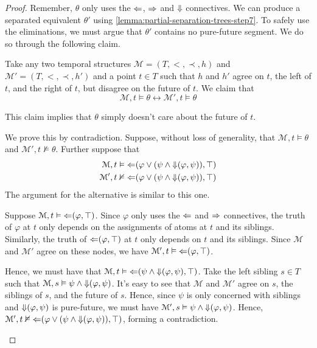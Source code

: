 \documentclass[a4paper,UKenglish,cleveref, autoref, thm-restate, numberwithinsect]{lipics-v2021}
\def\Larrow{\ensuremath\mathord{\Leftarrow}}
\def\Rarrow{\ensuremath\mathord{\Rightarrow}}
\def\Darrow{\ensuremath\mathord{\Downarrow}}
\begin{document}
\begin{proof}
    Remember, $\theta$ only uses the $\Larrow$, $\Rarrow$ and $\Darrow$ connectives. We can produce a separated equivalent $\theta'$ using \cref{lemma:partial-separation-trees-step7}. To safely use the eliminations, we must argue that $\theta'$ contains no pure-future segment. We do so through the following claim.
    \begin{claim*}
        Take any two temporal structures $\mathcal{M} = (T, <, \prec, h)$ and $\mathcal{M}' = (T, <, \prec, h')$ and a point $t \in T$ such that $h$ and $h'$ agree on $t$, the left of $t$, and the right of $t$, but disagree on the future of $t$. We claim that
        \begin{equation*}
            \mathcal{M}, t \vDash \theta \longleftrightarrow \mathcal{M}', t \vDash \theta
        \end{equation*}
        \begin{note*}
            This claim implies that $\theta$ simply doesn't care about the future of $t$.
        \end{note*}
    \end{claim*}
    \begin{claimproof}
        We prove this by contradiction. Suppose, without loss of generality, that $\mathcal{M}, t \vDash \theta$ and $\mathcal{M}', t \nvDash \theta$. Further suppose that
        \begin{equation*}
            \begin{aligned}
                \mathcal{M}, t &\vDash \Larrow(\varphi \lor (\psi \land \Darrow(\varphi, \psi)), \top)\\
                \mathcal{M}', t &\nvDash \Larrow(\varphi \lor (\psi \land \Darrow(\varphi, \psi)), \top)
            \end{aligned}
        \end{equation*}
        The argument for the alternative is similar to this one.

        Suppose $\mathcal{M}, t \vDash \Larrow(\varphi, \top)$. Since $\varphi$ only uses the $\Larrow$ and $\Rarrow$ connectives, the truth of $\varphi$ at $t$ only depends on the assignments of atoms at $t$ and its siblings. Similarly, the truth of $\Larrow(\varphi, \top)$ at $t$ only depends on $t$ and its siblings. Since $\mathcal{M}$ and $\mathcal{M}'$ agree on these nodes, we have $\mathcal{M}', t \vDash \Larrow(\varphi, \top)$.

        Hence, we must have that $\mathcal{M}, t \vDash \Larrow(\psi \land \Darrow(\varphi, \psi), \top)$. Take the left sibling $s \in T$ such that $\mathcal{M}, s \vDash \psi \land \Darrow(\varphi, \psi)$. It's easy to see that $\mathcal{M}$ and $\mathcal{M}'$ agree on $s$, the siblings of $s$, and the future of $s$. Hence, since $\psi$ is only concerned with siblings and $\Darrow(\varphi, \psi)$ is pure-future, we must have $\mathcal{M}', s \vDash \psi \land \Darrow(\varphi, \psi)$. Hence, $\mathcal{M}', t \nvDash \Larrow(\varphi \lor (\psi \land \Darrow(\varphi, \psi)), \top)$, forming a contradiction.
    \end{claimproof}


\end{proof}
\end{document}

